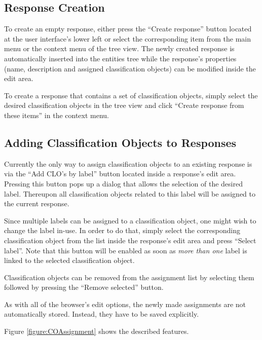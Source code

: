 \subsection{Response Creation}

To create an empty response, either press the ``Create response'' button located
at the user interface's lower left or select the corresponding item from the
main menu or the context menu of the tree view.  The newly created response is
automatically inserted into the entities tree while the response's properties
(name, description and assigned classification objects) can be modified inside
the edit area.

To create a response that contains a set of classification objects, simply
select the desired classification objects in the tree view and click ``Create
response from these items'' in the context menu.


\subsection{Adding Classification Objects to Responses}

Currently the only way to assign classification objects to an existing response
is via the ``Add CLO's by label'' button located inside a response's edit area.
Pressing this button pops up a dialog that allows the selection of the desired
label. Thereupon all classification objects related to this label will be
assigned to the current response.

Since multiple labels can be assigned to a classification object, one might wish
to change the label in-use. In order to do that, simply select the corresponding
classification object from the list inside the response's edit area and press
``Select label''. Note that this button will be enabled as soon as \emph{more
  than one} label is linked to the selected classification object.

Classification objects can be removed from the assignment list by selecting them
followed by pressing the ``Remove selected'' button.

As with all of the browser's edit options, the newly made assignments are not
automatically stored. Instead, they have to be saved explicitly.

Figure \ref{figure:COAssignment} shows the described features.

